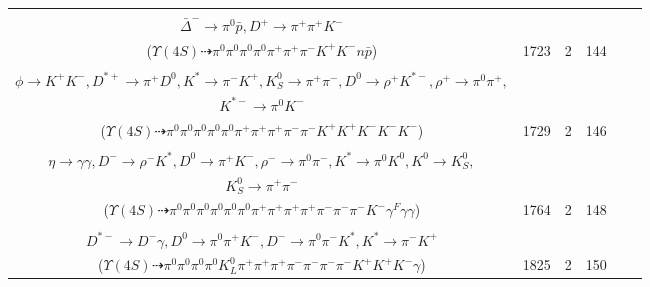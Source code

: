 \documentclass[landscape]{article}
\newcounter{rownumbers}
\newcommand\rn{\stepcounter{rownumbers}\arabic{rownumbers}}
\newcommand{\EOLP}{\\ \hline} %
\newcommand{\topoTags}[1]{#1} %
\begin{document}
\begin{longtable}{clcccc}
\rn & \makecell[l]{ $ 
\Upsilon(4S) \rightarrow B^{0} \bar{B}^{0} ,
B^{0} \rightarrow \pi^{0} K_2^{*0} ,
\bar{B}^{0} \rightarrow D^{*+} \Delta^{0} \bar{\Delta}^{-} ,
K_2^{*0} \rightarrow \pi^{-} K^{+} ,
D^{*+} \rightarrow \pi^{0} D^{+} ,
\Delta^{0} \rightarrow \pi^{0} n ,
$ \\ $
\bar{\Delta}^{-} \rightarrow \pi^{0} \bar{p} ,
D^{+} \rightarrow \pi^{+} \pi^{+} K^{-} 
$ \\ ($
\Upsilon(4S) \dashrightarrow \pi^{0} \pi^{0} \pi^{0} \pi^{0} \pi^{+} \pi^{+} \pi^{-} K^{+} K^{-} n \bar{p} 
$) } & \topoTags{1723 & }2 & 144 \EOLP

\rn & \makecell[l]{ $ 
\Upsilon(4S) \rightarrow B^{0} \bar{B}^{0} ,
B^{0} \rightarrow \pi^{0} K^{*}(1410)^{0} ,
\bar{B}^{0} \rightarrow K^{0} K^{*-} \phi D^{*+} ,
K^{*}(1410)^{0} \rightarrow \pi^{0} K^{*} ,
K^{0} \rightarrow K_{S}^{0} ,
K^{*-} \rightarrow \pi^{0} K^{-} ,
$ \\ $
\phi \rightarrow K^{+} K^{-} ,
D^{*+} \rightarrow \pi^{+} D^{0} ,
K^{*} \rightarrow \pi^{-} K^{+} ,
K_{S}^{0} \rightarrow \pi^{+} \pi^{-} ,
D^{0} \rightarrow \rho^{+} K^{*-} ,
\rho^{+} \rightarrow \pi^{0} \pi^{+} ,
$ \\ $
K^{*-} \rightarrow \pi^{0} K^{-} 
$ \\ ($
\Upsilon(4S) \dashrightarrow \pi^{0} \pi^{0} \pi^{0} \pi^{0} \pi^{0} \pi^{+} \pi^{+} \pi^{+} \pi^{-} \pi^{-} K^{+} K^{+} K^{-} K^{-} K^{-} 
$) } & \topoTags{1729 & }2 & 146 \EOLP

\rn & \makecell[l]{ $ 
\Upsilon(4S) \rightarrow B^{0} \bar{B}^{0} ,
B^{0} \rightarrow \rho^{+} \rho^{+} \rho^{-} \eta D^{-} ,
\bar{B}^{0} \rightarrow \pi^{0} D^{0} ,
\rho^{+} \rightarrow \pi^{0} \pi^{+} ,
\rho^{+} \rightarrow \pi^{0} \pi^{+} ,
\rho^{-} \rightarrow \pi^{0} \pi^{-} \gamma^{F} ,
$ \\ $
\eta \rightarrow \gamma \gamma ,
D^{-} \rightarrow \rho^{-} K^{*} ,
D^{0} \rightarrow \pi^{+} K^{-} ,
\rho^{-} \rightarrow \pi^{0} \pi^{-} ,
K^{*} \rightarrow \pi^{0} K^{0} ,
K^{0} \rightarrow K_{S}^{0} ,
$ \\ $
K_{S}^{0} \rightarrow \pi^{+} \pi^{-} 
$ \\ ($
\Upsilon(4S) \dashrightarrow \pi^{0} \pi^{0} \pi^{0} \pi^{0} \pi^{0} \pi^{0} \pi^{+} \pi^{+} \pi^{+} \pi^{+} \pi^{-} \pi^{-} \pi^{-} K^{-} \gamma^{F} \gamma \gamma 
$) } & \topoTags{1764 & }2 & 148 \EOLP

\rn & \makecell[l]{ $ 
\Upsilon(4S) \rightarrow B^{0} \bar{B}^{0} ,
B^{0} \rightarrow \rho^{0} \pi^{+} \rho^{-} \bar{K}^{0} K^{+} D^{*-} ,
\bar{B}^{0} \rightarrow \pi^{0} D^{0} ,
\rho^{0} \rightarrow \pi^{+} \pi^{-} ,
\rho^{-} \rightarrow \pi^{0} \pi^{-} ,
\bar{K}^{0} \rightarrow K_{L}^{0} ,
$ \\ $
D^{*-} \rightarrow D^{-} \gamma ,
D^{0} \rightarrow \pi^{0} \pi^{+} K^{-} ,
D^{-} \rightarrow \pi^{0} \pi^{-} K^{*} ,
K^{*} \rightarrow \pi^{-} K^{+} 
$ \\ ($
\Upsilon(4S) \dashrightarrow \pi^{0} \pi^{0} \pi^{0} \pi^{0} K_{L}^{0} \pi^{+} \pi^{+} \pi^{+} \pi^{-} \pi^{-} \pi^{-} \pi^{-} K^{+} K^{+} K^{-} \gamma 
$) } & \topoTags{1825 & }2 & 150 \EOLP


\end{longtable}
\end{document}
